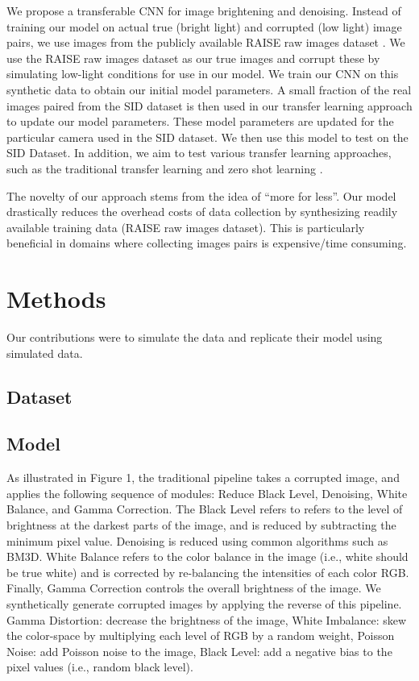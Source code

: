 \documentclass{article}
\begin{document}
We propose a transferable CNN for image brightening and denoising. Instead
of training our model on actual true (bright light) and corrupted
(low light) image pairs, we use images from the publicly available
RAISE raw images dataset \cite{Dang-Nguyen:2015:RRI:2713168.2713194}. We
use the RAISE raw images dataset as our true images and corrupt these by
simulating low-light conditions for use in our model. We train our CNN on
this synthetic
data to obtain our initial model parameters. A small fraction of the real
images paired from the SID dataset is then used in our transfer learning
\cite{Goodfellow-et-al-2016} approach to update our model parameters.
These model parameters are updated for the particular camera used in the
SID dataset. We then use this model to test on the SID Dataset. In
addition, we aim to test various transfer learning approaches, such as the
traditional transfer learning and zero shot learning \cite{larochelle2008, NIPS2009_3650,socher2013zeroshot}. \newline

The novelty of our approach stems from the idea of ``more for less''. Our
model drastically reduces the overhead costs of data collection by
synthesizing readily available training data (RAISE raw images dataset).
This is
particularly beneficial in domains where collecting images pairs is
expensive/time consuming.

\section{Methods}

Our contributions were to simulate the data and replicate their model
using simulated data.

\subsection{Dataset}

\subsection{Model}

As illustrated in Figure 1, the traditional pipeline takes a corrupted image, and applies the following sequence of modules: Reduce Black Level, Denoising, White Balance, and Gamma Correction. The Black Level refers to refers to the level of brightness at the darkest parts of the image, and is reduced by subtracting the minimum pixel value. Denoising is reduced using common algorithms such as BM3D. White Balance refers to the color balance in the image (i.e., white should be true white) and is corrected by re-balancing the intensities of each color RGB. Finally, Gamma Correction controls the overall brightness of the image. We synthetically generate corrupted images by applying the reverse of this pipeline. Gamma Distortion: decrease the brightness of the image, White Imbalance: skew the color-space by multiplying each level of RGB by a random weight, Poisson Noise: add Poisson noise to the image, Black Level: add a negative bias to the pixel values (i.e., random black level). 
\end{document}
